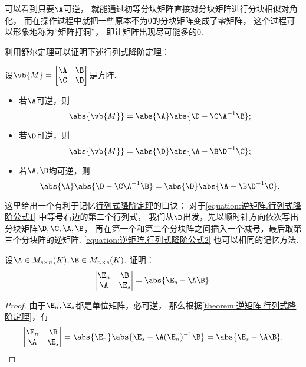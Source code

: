 可以看到只要\(\A\)可逆，
就能通过初等分块矩阵直接对分块矩阵进行分块相似对角化，
而在操作过程中就把一些原本不为0的分块矩阵变成了零矩阵，
这个过程可以形象地称为“矩阵打洞”，
即让矩阵出现尽可能多的0.

利用\hyperref[theorem:逆矩阵.舒尔定理]{舒尔定理}可以证明下述行列式降阶定理：
\begin{theorem}[行列式降阶定理]\label{theorem:逆矩阵.行列式降阶定理}
\def\M{\vb{M}}
设\(\M = \begin{bmatrix}
	\A & \B \\
	\C & \D
\end{bmatrix}\)是方阵.
\begin{itemize}
	\item 若\(\A\)可逆，则\begin{equation}\label{equation:逆矩阵.行列式降阶公式1}
		\abs{\M} = \abs{\A} \abs{\D - \C \A^{-1} \B};
	\end{equation}

	\item 若\(\D\)可逆，则\begin{equation}\label{equation:逆矩阵.行列式降阶公式2}
		\abs{\M} = \abs{\D} \abs{\A - \B \D^{-1} \C};
	\end{equation}

	\item 若\(\A,\D\)均可逆，则\begin{equation}
		\abs{\A} \abs{\D - \C \A^{-1} \B}
		= \abs{\D} \abs{\A - \B \D^{-1} \C}.
	\end{equation}
\end{itemize}
\end{theorem}
\begin{remark}
这里给出一个有利于记忆\hyperref[theorem:逆矩阵.行列式降阶定理]{行列式降阶定理}的口诀：
对于\cref{equation:逆矩阵.行列式降阶公式1} 中等号右边的第二个行列式，
我们从\(\D\)出发，先以顺时针方向依次写出分块矩阵\(\D,\C,\A,\B\)，
再在第一个和第二个分块阵之间插入一个减号，最后取第三个分块阵的逆矩阵.
\cref{equation:逆矩阵.行列式降阶公式2} 也可以相同的记忆方法.
\end{remark}

\begin{example}\label{example:逆矩阵.行列式降阶定理的重要应用1}
设\(\A \in M_{s \times n}(K),
\B \in M_{n \times s}(K)\).
证明：\[
	\begin{vmatrix}
		\E_n & \B \\
		\A & \E_s
	\end{vmatrix}
	= \abs{\E_s - \A\B}.
\]
\begin{proof}
由于\(\E_n,\E_s\)都是单位矩阵，必可逆，
那么根据\cref{theorem:逆矩阵.行列式降阶定理}，有\[
	\begin{vmatrix}
		\E_n & \B \\
		\A & \E_s
	\end{vmatrix}
	= \abs{\E_n} \abs{\E_s - \A(\E_n)^{-1}\B}
	= \abs{\E_s - \A\B}.
	\qedhere
\]
\end{proof}
\end{example}

